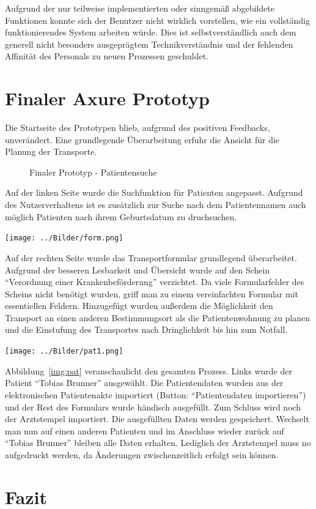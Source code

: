 \documentclass[a4paper, ngerman, 12pt]{scrartcl}
\begin{document}
Aufgrund der nur teilweise implementierten oder sinngemäß abgebildete Funktionen konnte sich der Benutzer nicht wirklich vorstellen, wie ein vollständig funktionierendes System arbeiten würde. Dies ist selbstverständlich auch dem generell nicht besonders ausgeprägtem Technikverständnis und der fehlenden Affinität des Personals zu neuen Prozessen geschuldet.
\section{Finaler Axure Prototyp}
Die Startseite des Prototypen blieb, aufgrund des positiven Feedbacks, unverändert. Eine grundlegende Überarbeitung erfuhr die Ansicht für die Planung der Transporte.
\begin{figure}[h]
\centering
{}
\caption{Finaler Prototyp - Patientensuche}
\label{img:patsearch}
\end{figure}
Auf der linken Seite wurde die Suchfunktion für Patienten angepasst. Aufgrund des Nutzerverhaltens ist es zusätzlich zur Suche nach dem Patientennamen auch möglich Patienten nach ihrem Geburtsdatum zu druchsuchen.
\begin{center}
\begin{minipage}{0.8\textwidth}
	\centering
	\texttt{[image: ../Bilder/form.png]}
	\label{img:form}
\end{minipage}
\end{center}
Auf der rechten Seite wurde das Transportformular grundlegend überarbeitet. Aufgrund der besseren Lesbarkeit und Übersicht wurde auf den Schein ``Verordnung einer Krankenbeförderung'' verzichtet. Da viele Formularfelder des Scheins nicht benötigt wurden, griff man zu einem vereinfachten Formular mit essentiellen Feldern. Hinzugefügt wurden außerdem die Möglichkeit den Transport an einen anderen Bestimmungsort als die Patientenwohnung zu planen und die Einstufung des Transportes nach Dringlichkeit bis hin zum Notfall.\\
\begin{center}
\begin{minipage}{\textwidth}
\centering
\texttt{[image: ../Bilder/pat1.png]}
\label{img:pat}
\end{minipage}
\end{center}
Abbildung~\ref{img:pat} veranschaulicht den gesamten Prozess. Links wurde der Patient ``Tobias Brunner'' ausgewählt. Die Patientendaten wurden aus der elektronischen Patientenakte importiert (Button: ``Patientendaten importieren'') und der Rest des Formulars wurde händisch ausgefüllt. Zum Schluss wird noch der Arztstempel importiert. Die ausgefüllten Daten werden gespeichert. Wechselt man nun auf einen anderen Patienten und im Anschluss wieder zurück auf ``Tobias Brunner'' bleiben alle Daten erhalten. Lediglich der Arztstempel muss no aufgedruckt werden, da Änderungen zwischenzeitlich erfolgt sein können.
\section{Fazit}
\end{document}
